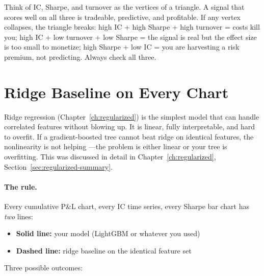 \begin{intuition}
Think of IC, Sharpe, and turnover as the vertices of a triangle.
A signal that scores well on all three is tradeable, predictive, and
profitable.  If any vertex collapses, the triangle breaks:
high IC + high Sharpe + high turnover = costs kill you;
high IC + low turnover + low Sharpe = the signal is real but the
effect size is too small to monetize;
high Sharpe + low IC = you are harvesting a risk premium, not predicting.
Always check all three.
\end{intuition}

\section{Ridge Baseline on Every Chart}
\label{sec:presenting:ridge}

\begin{prereq}
Ridge regression (Chapter~\ref{ch:regularized}) is the simplest model
that can handle correlated features without blowing up.  It is linear,
fully interpretable, and hard to overfit.  If a gradient-boosted tree
cannot beat ridge on identical features, the nonlinearity is not helping
---the problem is either linear or your tree is overfitting.  This was
discussed in detail in Chapter~\ref{ch:regularized},
Section~\ref{sec:regularized-summary}.
\end{prereq}

\paragraph{The rule.}  Every cumulative P\&L chart, every IC time series,
every Sharpe bar chart has \emph{two} lines:

\begin{itemize}[leftmargin=1.5em]
  \item \textbf{Solid line:} your model (LightGBM or whatever you used)
  \item \textbf{Dashed line:} ridge baseline on the identical feature set
\end{itemize}

Three possible outcomes:


